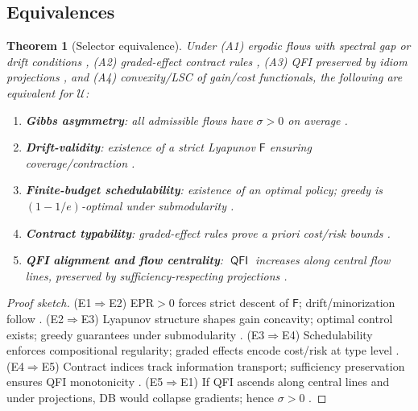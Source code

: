 \documentclass[11pt]{article}
\theoremstyle{plain}
\newtheorem{theorem}{Theorem}[section]
\theoremstyle{definition}
\theoremstyle{remark}
\DeclareMathOperator{\QFI}{\mathsf{QFI}}
\newcommand{\1}{\mathds{1}}
\newcommand{\U}{\mathcal{U}}
\newcommand{\Free}{\mathsf{F}}
\newcommand{\EP}{\sigma} %
\begin{document}
\subsection{Equivalences}
\begin{theorem}[Selector equivalence]\label{thm:equivalence}
Under (A1) ergodic flows with spectral gap or drift conditions \cite{LevinPeresWilmer2009}, (A2) graded-effect contract rules \cite{GradedEffects2025,MeasureContracts2025}, (A3) QFI preserved by idiom projections \cite{AmariNagaoka2000,Petz2002,IdiomProjections2025,QFI2025}, and (A4) convexity/LSC of gain/cost functionals, the following are equivalent for $\U$:
\begin{enumerate}[label=(E\arabic*)]
\item \textbf{Gibbs asymmetry}: all admissible flows have $\EP>0$ on average \cite{Schnakenberg1976,Seifert2012}.
\item \textbf{Drift-validity}: existence of a strict Lyapunov $\Free$ ensuring coverage/contraction \cite{LevinPeresWilmer2009,JordanKinderlehrerOtto1998}.
\item \textbf{Finite-budget schedulability}: existence of an optimal policy; greedy is $(1-1/e)$-optimal under submodularity \cite{Nemhauser1978,MurphyBudget2025}.
\item \textbf{Contract typability}: graded-effect rules prove a priori cost/risk bounds \cite{GradedEffects2025,MeasureContracts2025}.
\item \textbf{QFI alignment and flow centrality}: $\QFI$ increases along central flow lines, preserved by sufficiency-respecting projections \cite{AmariNagaoka2000,Petz2002,FlowCentrality2025,IdiomProjections2025}.
\end{enumerate}
\end{theorem}

\begin{proof}[Proof sketch]
(E1$\Rightarrow$E2) EPR$>0$ forces strict descent of $\Free$; drift/minorization follow \cite{LevinPeresWilmer2009}.  
(E2$\Rightarrow$E3) Lyapunov structure shapes gain concavity; optimal control exists; greedy guarantees under submodularity \cite{Nemhauser1978}.  
(E3$\Rightarrow$E4) Schedulability enforces compositional regularity; graded effects encode cost/risk at type level \cite{GradedEffects2025,MeasureContracts2025}.  
(E4$\Rightarrow$E5) Contract indices track information transport; sufficiency preservation ensures QFI monotonicity \cite{AmariNagaoka2000,Petz2002}.  
(E5$\Rightarrow$E1) If QFI ascends along central lines and under projections, DB would collapse gradients; hence $\EP>0$ \cite{Schnakenberg1976,Seifert2012}.
\end{proof}
\end{document}
